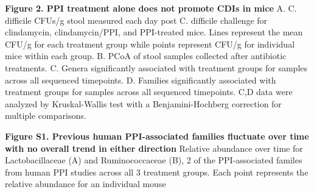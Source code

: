 \documentclass[11pt,]{article}
\begin{document}
\textbf{Figure 2. PPI treatment alone does not promote CDIs in mice} A.
C. difficile CFUs/g stool measured each day post C. difficile challenge
for clindamycin, clindamycin/PPI, and PPI-treated mice. Lines represent
the mean CFU/g for each treatment group while points represent CFU/g for
individual mice within each group. B. PCoA of stool samples collected
after antibiotic treatments. C. Genera significantly associated with
treatment groups for samples across all sequenced timepoints. D.
Families significantly associated with treatment groups for samples
across all sequenced timepoints. C,D data were analyzed by
Kruskal-Wallis test with a Benjamini-Hochberg correction for multiple
comparisons.

\textbf{Figure S1. Previous human PPI-associated families fluctuate over
time with no overall trend in either direction} Relative abundance over
time for Lactobacillaceae (A) and Ruminococcaceae (B), 2 of the
PPI-associated familes from human PPI studies across all 3 treatment
groups. Each point represents the relative abundance for an individual
mouse
\end{document}
